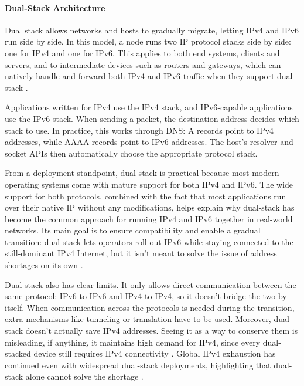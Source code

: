 \paragraph{Dual-Stack Architecture} 

Dual stack allows networks and hosts to gradually migrate, letting IPv4 and IPv6 run side by side\cite{punithavathani2009ipv4}. In this model, a node runs two IP protocol stacks side by side: one for IPv4 and one for IPv6. This applies to both end systems, clients and servers, and to intermediate devices such as routers and gateways, which can natively handle and forward both IPv4 and IPv6 traffic when they support dual stack \cite{punithavathani2009ipv4}.

Applications written for IPv4 use the IPv4 stack, and IPv6‑capable applications use the IPv6 stack. When sending a packet, the destination address decides which stack to use\cite{rfc4213}. In practice, this works through DNS: A records point to IPv4 addresses, while AAAA records point to IPv6 addresses. The host’s resolver and socket APIs then automatically choose the appropriate protocol stack\cite{punithavathani2009ipv4}.

From a deployment standpoint, dual stack is practical because most modern operating systems come with mature support for both IPv4 and IPv6\cite{rfc7381}. The wide support for both protocols, combined with the fact that most applications run over their native IP without any modifications, helps explain why dual-stack has become the common approach for running IPv4 and IPv6 together in real-world networks\cite{punithavathani2009ipv4}. Its main goal is to ensure compatibility and enable a gradual transition: dual-stack lets operators roll out IPv6 while staying connected to the still-dominant IPv4 Internet, but it isn’t meant to solve the issue of address shortages on its own \cite{LEVIN20141059}.

Dual stack also has clear limits. It only allows direct communication between the same protocol: IPv6 to IPv6 and IPv4 to IPv4, so it doesn't bridge the two by itself. When communication across the protocols is needed during the transition, extra mechanisms like tunneling or translation have to be used\cite{punithavathani2009ipv4}. Moreover, dual-stack doesn’t actually save IPv4 addresses. Seeing it as a way to conserve them is misleading, if anything, it maintains high demand for IPv4, since every dual-stacked device still requires IPv4 connectivity\cite{rfc4241} . Global IPv4 exhaustion has continued even with widespread dual-stack deployments, highlighting that dual-stack alone cannot solve the shortage \cite{LEVIN20141059}.

